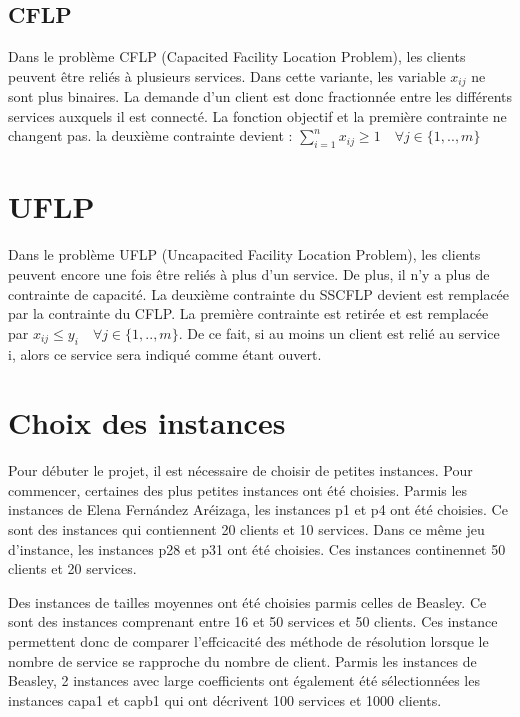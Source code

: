 \subsection{CFLP}

Dans le problème CFLP (Capacited Facility Location Problem), les clients peuvent être reliés à plusieurs services. Dans cette variante, les variable $x_{ij}$ ne sont plus binaires. La demande d'un client est donc fractionnée entre les différents services auxquels il est connecté. La fonction objectif et la première contrainte ne changent pas. la deuxième contrainte devient :
$ \sum \limits_{i=1}^n x_{ij} \geq 1 \quad \forall j \in \{1,..,m\}$

\section {UFLP}

Dans le problème UFLP (Uncapacited Facility Location Problem), les clients peuvent encore une fois être reliés à plus d'un service. De plus, il n'y a plus de contrainte de capacité.
La deuxième contrainte du SSCFLP devient est remplacée par la contrainte du CFLP.
La première contrainte est retirée et est remplacée par
$ x_{ij} \leq y_i \quad \forall j \in \{1,..,m\}$. De ce fait, si au moins un client est relié au service i, alors ce service sera indiqué comme étant ouvert.


\section{Choix des instances}

Pour débuter le projet, il est nécessaire de choisir de petites instances.
Pour commencer, certaines des plus petites instances ont été choisies.
Parmis les instances de Elena Fernández Aréizaga, les instances p1 et p4 ont été choisies. Ce sont des instances qui contiennent 20 clients et 10 services.
Dans ce même jeu d'instance, les instances p28 et p31 ont été choisies. Ces instances continennet 50 clients et 20 services. \newline

Des instances de tailles moyennes ont été choisies parmis celles de Beasley. Ce sont des instances comprenant entre 16 et 50 services et 50 clients.
Ces instance permettent donc de comparer l'effcicacité des méthode de résolution lorsque le nombre de service se rapproche du nombre de client.
Parmis les instances de Beasley, 2 instances avec large coefficients ont également été sélectionnées les instances capa1 et capb1 qui ont décrivent 100 services et 1000 clients. \newline

